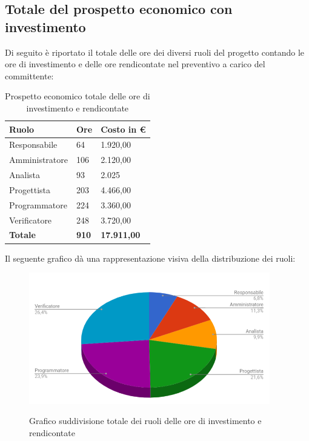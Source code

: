 \documentclass[PianoDiProgetto.tex]{subfiles}
\begin{document}
\subsection{Totale del prospetto economico con investimento}
Di seguito è riportato il totale delle ore dei diversi ruoli del progetto contando le ore di investimento e delle ore rendicontate nel preventivo a carico del committente:
\begin{center}
	\begin{table}[htbp]
		\centering
		\renewcommand\arraystretch{1.5}
		\begin{tabularx}{\textwidth}{p{5cm}|p{4cm}|p{4cm}}
			\hline
			\textbf{Ruolo} & \textbf{Ore} & \textbf{Costo in \euro} \\
			\hline
			Responsabile & 64 & 1.920,00 \\
			\hline
			Amministratore & 106 & 2.120,00 \\
			\hline
			Analista & 93 & 2.025 \\
			\hline
			Progettista & 203 & 4.466,00 \\
			\hline
			Programmatore & 224 & 3.360,00 \\
			\hline
			Verificatore & 248 & 3.720,00 \\
			\hline
			\textbf{Totale} & \textbf{910} & \textbf{17.911,00}\\
			\hline
		\end{tabularx}
	\caption{Prospetto economico totale delle ore di investimento e rendicontate}
	\label{my-label}
	\end{table} 
\end{center}
Il seguente grafico dà una rappresentazione visiva della distribuzione dei ruoli:
\begin{figure}[ht]
	\centering
	\includegraphics[width=10.5cm]{images/prospettoEconomico/totInv.png}
	\label{fig:foo}
	\caption{Grafico suddivisione totale dei ruoli delle ore di investimento e rendicontate}
\end{figure} 
\end{document}
